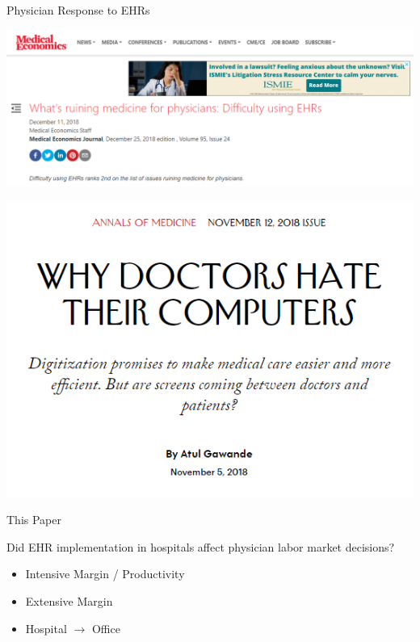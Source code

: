 \documentclass[10pt]{beamer}
\begin{document}
\begin{frame}{Physician Response to EHRs}
\begin{center}
    \includegraphics[scale=.3]{graphics/News Clip3.PNG}
    
    \vspace{3mm}
    
    \includegraphics[scale=.3]{graphics/News Clip2.PNG}
\end{center}

\end{frame}


\begin{frame}{This Paper}

Did EHR implementation in hospitals affect physician labor market decisions?
\begin{itemize}
    \item Intensive Margin / Productivity
    \item Extensive Margin
    \item Hospital $\rightarrow$ Office
\end{itemize}

\end{frame}
\end{document}
